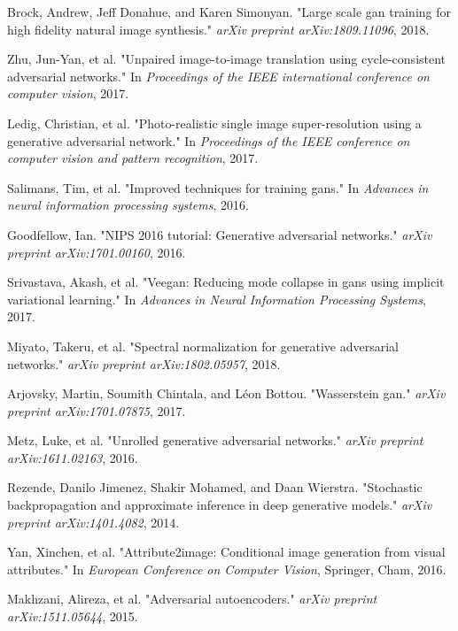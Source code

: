 \documentclass{article}
\begin{document}
\begin{thebibliography}{9}
   Brock, Andrew, Jeff Donahue, and Karen Simonyan. "Large scale gan training for high fidelity natural image synthesis." \textit{arXiv preprint arXiv:1809.11096}, 2018.

   Zhu, Jun-Yan, et al. "Unpaired image-to-image translation using cycle-consistent adversarial networks." In \textit{Proceedings of the IEEE international conference on computer vision}, 2017.
   
    Ledig, Christian, et al. "Photo-realistic single image super-resolution using a generative adversarial network." In \textit{Proceedings of the IEEE conference on computer vision and pattern recognition}, 2017.
    
   Salimans, Tim, et al. "Improved techniques for training gans." In \textit{Advances in neural information processing systems}, 2016.
   
   Goodfellow, Ian. "NIPS 2016 tutorial: Generative adversarial networks." \textit{arXiv preprint arXiv:1701.00160}, 2016.
   
   Srivastava, Akash, et al. "Veegan: Reducing mode collapse in gans using implicit variational learning." In \textit{Advances in Neural Information Processing Systems}, 2017.
   
   Miyato, Takeru, et al. "Spectral normalization for generative adversarial networks." \textit{arXiv preprint arXiv:1802.05957}, 2018.
   
   Arjovsky, Martin, Soumith Chintala, and Léon Bottou. "Wasserstein gan." \textit{arXiv preprint arXiv:1701.07875}, 2017.
   
   Metz, Luke, et al. "Unrolled generative adversarial networks." \textit{arXiv preprint arXiv:1611.02163}, 2016.


   Rezende, Danilo Jimenez, Shakir Mohamed, and Daan Wierstra. "Stochastic backpropagation and approximate inference in deep generative models." \textit{arXiv preprint arXiv:1401.4082}, 2014.

    Yan, Xinchen, et al. "Attribute2image: Conditional image generation from visual attributes." In \textit{European Conference on Computer Vision}, Springer, Cham, 2016.
    
    Makhzani, Alireza, et al. "Adversarial autoencoders." \textit{arXiv preprint arXiv:1511.05644}, 2015.
    

\end{thebibliography}
\end{document}
